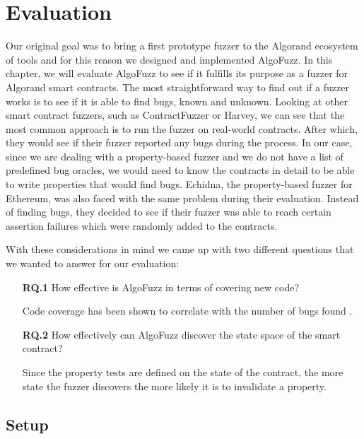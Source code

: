 
\chapter{Evaluation}\label{chapter:evaluation}
Our original goal was to bring a first prototype fuzzer to the Algorand ecosystem of tools and for this reason we designed and implemented AlgoFuzz.
In this chapter, we will evaluate AlgoFuzz to see if it fulfills its purpose as a fuzzer for Algorand smart contracts.
The most straightforward way to find out if a fuzzer works is to see if it is able to find bugs, known and unknown.
Looking at other smart contract fuzzers, such as ContractFuzzer or Harvey, we can see that the most common approach is to run the fuzzer on real-world contracts.
After which, they would see if their fuzzer reported any bugs during the process.
In our case, since we are dealing with a property-based fuzzer and we do not have a list of predefined bug oracles, we would need to know the contracts in detail to be able to write properties that would find bugs.
Echidna, the property-based fuzzer for Ethereum, was also faced with the same problem during their evaluation.
Instead of finding bugs, they decided to see if their fuzzer was able to reach certain assertion failures which were randomly added to the contracts.

With these considerations in mind we came up with two different questions that we wanted to answer for our evaluation:
\begin{enumerate}
    \item[\textbf{RQ.1}] How effective is AlgoFuzz in terms of covering new code?

        Code coverage has been shown to correlate with the number of bugs found \cite{kochhar_code_2015}.

    \item[\textbf{RQ.2}] How effectively can AlgoFuzz discover the state space of the smart contract?

        Since the property tests are defined on the state of the contract, the more state the fuzzer discovers the more likely it is to invalidate a property.
\end{enumerate}

\section{Setup}

